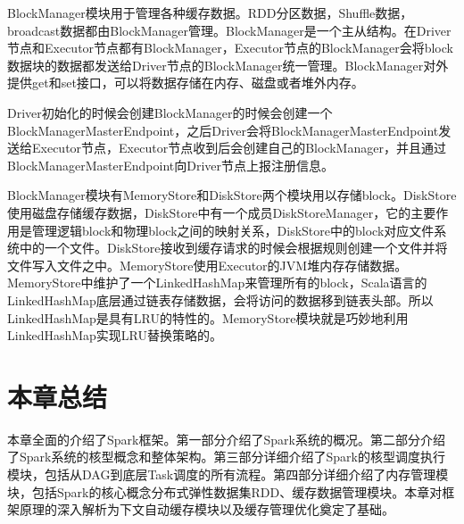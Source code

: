BlockManager模块用于管理各种缓存数据。RDD分区数据，Shuffle数据，broadcast数据都由BlockManager管理。BlockManager是一个主从结构。在Driver节点和Executor节点都有BlockManager，Executor节点的BlockManager会将block数据块的数据都发送给Driver节点的BlockManager统一管理。BlockManager对外提供get和set接口，可以将数据存储在内存、磁盘或者堆外内存。

Driver初始化的时候会创建BlockManager的时候会创建一个BlockManagerMasterEndpoint，之后Driver会将BlockManagerMasterEndpoint发送给Executor节点，Executor节点收到后会创建自己的BlockManager，并且通过BlockManagerMasterEndpoint向Driver节点上报注册信息。

BlockManager模块有MemoryStore和DiskStore两个模块用以存储block。DiskStore使用磁盘存储缓存数据，DiskStore中有一个成员DiskStoreManager，它的主要作用是管理逻辑block和物理block之间的映射关系，DiskStore中的block对应文件系统中的一个文件。DiskStore接收到缓存请求的时候会根据规则创建一个文件并将文件写入文件之中。MemoryStore使用Executor的JVM堆内存存储数据。MemoryStore中维护了一个LinkedHashMap来管理所有的block，Scala语言的LinkedHashMap底层通过链表存储数据，会将访问的数据移到链表头部。所以LinkedHashMap是具有LRU的特性的。MemoryStore模块就是巧妙地利用LinkedHashMap实现LRU替换策略的。

\section{本章总结}

本章全面的介绍了Spark框架。第一部分介绍了Spark系统的概况。第二部分介绍了Spark系统的核型概念和整体架构。第三部分详细介绍了Spark的核型调度执行模块，包括从DAG到底层Task调度的所有流程。第四部分详细介绍了内存管理模块，包括Spark的核心概念分布式弹性数据集RDD、缓存数据管理模块。本章对框架原理的深入解析为下文自动缓存模块以及缓存管理优化奠定了基础。




